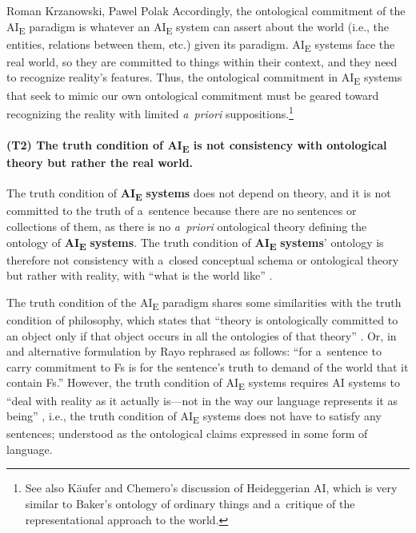 \begin{artengenv2auth}{Roman Krzanowski, Pawel Polak}
Accordingly, the ontological commitment of the AI\textsubscript{E} paradigm is whatever an AI\textsubscript{E} system can assert about the world (i.e., the entities, relations between them, etc.) given its paradigm. AI\textsubscript{E} systems face the real world, so they are committed to things within their context, and they need to recognize reality's features. Thus, the ontological commitment in AI\textsubscript{E} systems that seek to mimic our own ontological commitment must be geared toward recognizing the reality with limited \textit{a~priori} suppositions.\footnote{See also Käufer and Chemero's
\parencite*[][p.220]{kaufer_phenomenology_2021} %
 discussion of Heideggerian AI, which is very similar to Baker's ontology of ordinary things 
\parencite[][]{baker_metaphysics_2007} %
 and a~critique of the representational approach to the world.}

\paragraph{(T2) The truth condition of AI\textsubscript{E} is not consistency with ontological theory but rather the real world.}
The truth condition of \textbf{AI}\textbf{\textsubscript{E}} \textbf{systems} does not depend on theory, and it is not committed to the truth of a~sentence because there are no sentences or collections of them, as there is no \textit{a~priori} ontological theory defining the ontology of \textbf{AI}\textbf{\textsubscript{E}} \textbf{systems}. The truth condition of \textbf{AI}\textbf{\textsubscript{E}} \textbf{systems}' ontology is therefore not consistency with a~closed conceptual schema or ontological theory but rather with reality, with ``what is the world like''
\parencite[][p.57]{smith_promise_2019}.%


The truth condition of the AI\textsubscript{E} paradigm shares some similarities with the truth condition of philosophy, which states that ``theory is ontologically committed to an object only if that object occurs in all the ontologies of that theory''
\parencite[][p.631]{gibson_ontological_2009}. %
 Or, in and alternative formulation by Rayo 
\parencite[][]{rayo_ontological_2007} %
 rephrased as follows: ``for a~sentence to carry commitment to Fs is for the sentence's truth to demand of the world that it contain Fs.'' However, the truth condition of AI\textsubscript{E} systems requires AI systems to ``deal with reality as it actually is---not in the way our language represents it as being'' 
\parencite[][p.34]{smith_promise_2019}, %
 i.e., the truth condition of AI\textsubscript{E} systems does not have to satisfy any sentences; understood as the ontological claims expressed in some form of language.


\end{artengenv2auth}
